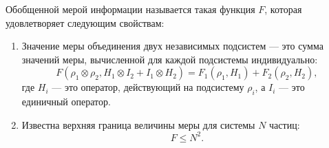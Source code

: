 \begin{definition}\label{def:f}
Обобщенной мерой информации называется такая функция $F$,
которая удовлетворяет следующим свойствам:
\begin{enumerate}
  \item Значение меры объединения двух независимых подсистем --- это сумма значений меры, вычисленной для каждой подсистемы индивидуально:
  \begin{equation}\label{eq:f-additive-map}
    F(\rho_1 \otimes \rho_2 ,H_1 \otimes I_2 + I_1 \otimes H_2)
    = F_{1} (\rho_1, H_1) + F_{2} (\rho_2 , H_2),
  \end{equation}
  где $H_i$ --- это оператор, действующий на подсистему $\rho_i$,
  а $I_i$ --- это единичный оператор.

  \item Известна верхняя граница величины меры для системы $N$ частиц:
  \begin{equation}\label{eq:f-supremum}
    F \leq N^2.
  \end{equation}
\end{enumerate}
\end{definition}

